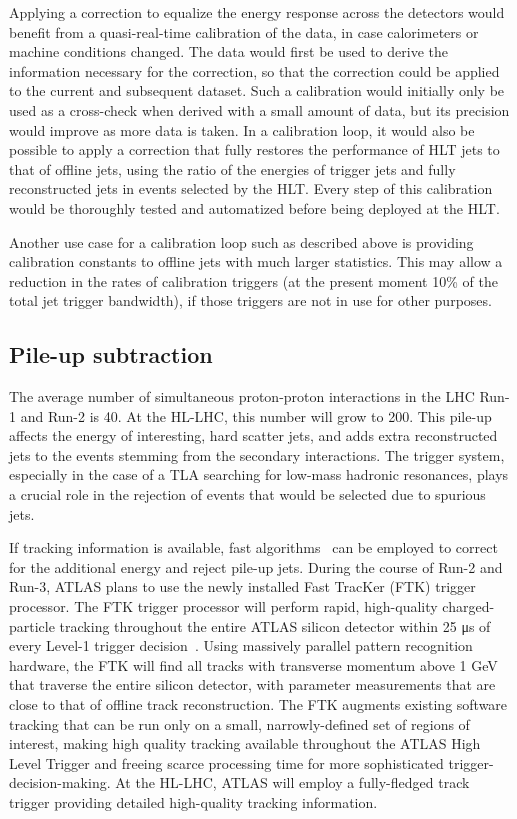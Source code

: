 \documentclass[a4paper,justified]{tufte-handout}
\begin{document}
Applying a correction to equalize the energy response across the detectors would benefit from a quasi-real-time calibration of the data, in case calorimeters or machine conditions changed. The data would first be used to derive the information necessary for the correction, so that the correction could be applied to the current and subsequent dataset. Such a calibration would initially only be used as a cross-check when derived with a small amount of data, but its precision would improve as more data is taken. In a calibration loop, it  would also be possible to apply a correction that fully restores the performance of HLT jets to that of offline jets, using the ratio of the energies of trigger jets and fully reconstructed jets in events selected by the HLT. Every step of this calibration would be thoroughly tested and automatized before being deployed at the HLT. 

Another use case for a calibration loop such as described above is providing calibration constants to offline jets with much larger statistics. This may allow a reduction in the rates of calibration triggers (at the present moment 10\% of the total jet trigger bandwidth), if those triggers are not in use for other purposes.

\subsection{Pile-up subtraction}

The average number of simultaneous proton-proton interactions in the LHC Run-1 and Run-2 is 40.  At the HL-LHC, this number will grow to 200. This pile-up affects the energy of interesting, hard scatter jets, and adds extra reconstructed jets to the events stemming from the secondary interactions. The trigger system, especially in the case of a TLA searching for low-mass hadronic resonances, plays a crucial role in the rejection of events that would be selected due to spurious jets. 

If tracking information is available, fast algorithms~\cite{ATLAS:2017pfq,Bertolini:2014bba,Cacciari:2014gra} can be employed to correct for the additional energy and reject pile-up jets. During the course of  Run-2 and Run-3, ATLAS plans to use the newly installed Fast TracKer (FTK) trigger processor. The FTK  trigger processor will perform rapid, high-quality charged-particle tracking throughout the entire ATLAS silicon detector within 25 μs of every Level-1 trigger decision~\cite{1748-0221-7-10-C10002,Shochet:2013gaw}.  Using massively parallel pattern recognition hardware, the FTK will find all tracks with transverse momentum above 1 GeV that traverse the entire silicon detector, with parameter measurements that are close to that of offline track reconstruction. The FTK augments existing software tracking that can be run only on a small, narrowly-defined set of regions of interest, making high quality tracking available throughout the ATLAS High Level Trigger and freeing scarce processing time for more sophisticated trigger-decision-making. At the HL-LHC, ATLAS will employ a fully-fledged track trigger providing detailed high-quality tracking information. 
\end{document}
